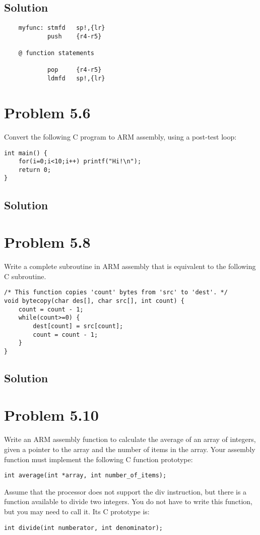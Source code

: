 \documentclass[letterpaper,11pt]{texMemo} %
\begin{document}
\subsection*{Solution}

\begin{lstlisting}
    myfunc: stmfd   sp!,{lr}
            push    {r4-r5}

    @ function statements

            pop     {r4-r5}
            ldmfd   sp!,{lr}
\end{lstlisting}


\section*{Problem 5.6}
Convert the following C program to ARM assembly, using a post-test loop:
\begin{lstlisting}
int main() {
    for(i=0;i<10;i++) printf("Hi!\n");
    return 0;
}
\end{lstlisting}
\subsection*{Solution}


\newpage
\section*{Problem 5.8}
Write a complete subroutine in ARM assembly that is equivalent to the following C subroutine.
\begin{lstlisting}
/* This function copies 'count' bytes from 'src' to 'dest'. */
void bytecopy(char des[], char src[], int count) {
    count = count - 1;
    while(count>=0) {
        dest[count] = src[count];
        count = count - 1;
    }
}
\end{lstlisting}
\subsection*{Solution}


\newpage
\section*{Problem 5.10}
Write an ARM assembly function to calculate the average of an array of integers, given a
pointer to the array and the number of items in the array. Your assembly function must 
implement the following C function prototype:
\begin{lstlisting}
int average(int *array, int number_of_items);
\end{lstlisting}
Assume that the processor does not support the div instruction, but there is a function
available to divide two integers. You do not have to write this function, but you may need
to call it. Its C prototype is:
\begin{lstlisting}
int divide(int numberator, int denominator);
\end{lstlisting}
\end{document}
